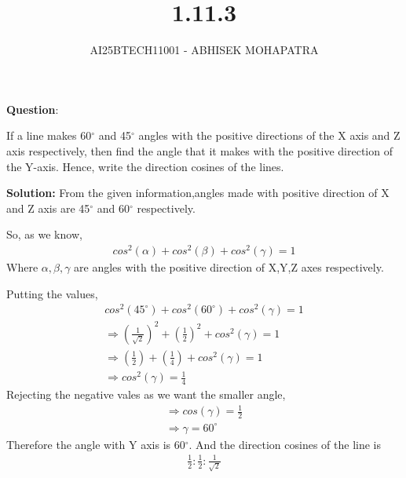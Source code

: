 \documentclass{beamer}
\title{1.11.3}
\author{AI25BTECH11001 - ABHISEK MOHAPATRA}
\theoremstyle{remark}
\numberwithin{equation}{section}
\begin{document}
{\let\newpage\relax\maketitle}
\renewcommand{\thefigure}{\theenumi}
\renewcommand{\thetable}{\theenumi}

		\textbf{Question}:

	 If a line makes 60$^\circ$ and 45$^\circ$ angles with the 
	 positive directions of the X axis and Z axis respectively, then find the angle that it makes 
	 with the positive direction of the Y-axis. Hence, write the direction cosines of the lines.

		\textbf{Solution:} From the given information,angles made with positive direction of X and Z axis are 45$^\circ$ and 60$^\circ$ respectively.
		
		So, as we know,
		\begin{align}
			cos^2(\alpha) + cos^2(\beta) + cos^2(\gamma) = 1 
		\end{align}
		Where $\alpha,\beta,\gamma$ are angles with the positive direction of X,Y,Z axes respectively.


		Putting the values, 
		\begin{align}
			cos^2(45^\circ) + cos^2(60^\circ) + cos^2(\gamma) = 1 
			\\
			\Rightarrow	(\frac{1}{\sqrt{2}})^2 + (\frac{1}{2})^2 + cos^2(\gamma) = 1
			\\
			\Rightarrow	(\frac{1}{{2}}) + (\frac{1}{4}) + cos^2(\gamma) = 1
			\\
			\Rightarrow	cos^2(\gamma) = \frac{1}{4}
		\end{align}
		Rejecting the negative vales as we want the smaller angle,
		\begin{align}
			\Rightarrow	cos(\gamma) = \frac{1}{2}
			\\
			\Rightarrow     \gamma = 60^\circ
		\end{align}
		Therefore the angle with Y axis is 60$^\circ$.
		And the direction cosines of the line is 
\begin{align}
	\frac{1}{2}:\frac{1}{2}:\frac{1}{\sqrt{2}}
\end{align}
\end{document}
